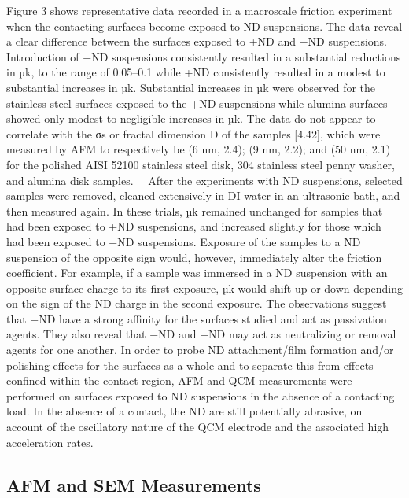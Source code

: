 Figure 3 shows representative data recorded in a macroscale friction experiment when the contacting surfaces become exposed to ND suspensions. The data reveal a clear difference between the surfaces exposed to +ND and −ND suspensions. Introduction of −ND suspensions consistently resulted in a substantial reductions in µk, to the range of 0.05–0.1 while +ND consistently resulted in a modest to substantial increases in µk. Substantial increases in µk were observed for the stainless steel surfaces exposed to the +ND suspensions while alumina surfaces showed only modest to negligible increases in µk. The data do not appear to correlate with the σs or fractal dimension D of the samples [4.42], which were measured by AFM to respectively be (6 nm, 2.4); (9 nm, 2.2); and (50 nm, 2.1) for the polished AISI 52100 stainless steel disk, 304 stainless steel penny washer, and alumina disk samples. 
After the experiments with ND suspensions, selected samples were removed, cleaned extensively in DI water in an ultrasonic bath, and then measured again. In these trials, µk remained unchanged for samples that had been exposed to +ND suspensions, and increased slightly for those which had been exposed to −ND suspensions. Exposure of the samples to a ND suspension of the opposite sign would, however, immediately alter the friction coefficient. For example, if a sample was immersed in a ND suspension with an opposite surface charge to its first exposure, µk would shift up or down depending on the sign of the ND charge in the second exposure.
The observations suggest that −ND have a strong affinity for the surfaces studied and act as passivation agents. They also reveal that −ND and +ND may act as neutralizing or removal agents for one another. In order to probe ND attachment/film formation and/or polishing effects for the surfaces as a whole and to separate this from effects confined within the contact region, AFM and QCM measurements were performed on surfaces exposed to ND suspensions in the absence of a contacting load. In the absence of a contact, the ND are still potentially abrasive, on account of the oscillatory nature of the QCM electrode and the associated high acceleration rates.

\subsection{AFM and SEM Measurements}

